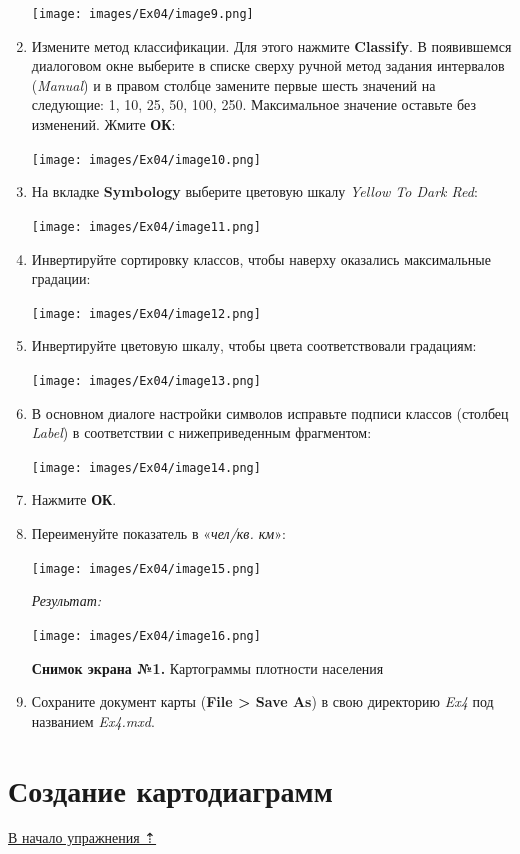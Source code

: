 \documentclass[12pt,]{book}
\begin{document}
\begin{enumerate}
  \texttt{[image: images/Ex04/image9.png]}
\item
  Измените метод классификации. Для этого нажмите \textbf{Classify}. В появившемся диалоговом окне выберите в списке сверху ручной метод задания интервалов (\emph{Manual}) и в правом столбце замените первые шесть значений на следующие: 1, 10, 25, 50, 100, 250. Максимальное значение оставьте без изменений. Жмите \textbf{ОК}:

  \texttt{[image: images/Ex04/image10.png]}
\item
  На вкладке \textbf{Symbology} выберите цветовую шкалу \emph{Yellow To Dark Red}:

  \texttt{[image: images/Ex04/image11.png]}
\item
  Инвертируйте сортировку классов, чтобы наверху оказались максимальные градации:

  \texttt{[image: images/Ex04/image12.png]}
\item
  Инвертируйте цветовую шкалу, чтобы цвета соответствовали градациям:

  \texttt{[image: images/Ex04/image13.png]}
\item
  В основном диалоге настройки символов исправьте подписи классов (столбец \emph{Label}) в соответствии с нижеприведенным фрагментом:

  \texttt{[image: images/Ex04/image14.png]}
\item
  Нажмите \textbf{ОК}.
\item
  Переименуйте показатель в «\emph{чел/кв. км}»:

  \texttt{[image: images/Ex04/image15.png]}

  \emph{Результат:}

  \texttt{[image: images/Ex04/image16.png]}

  \textbf{Снимок экрана №1.} Картограммы плотности населения
\item
  Сохраните документ карты (\textbf{File \textgreater{} Save As}) в свою директорию \emph{Ex4} под названием \emph{Ex4.mxd}.
\end{enumerate}

\hypertarget{map-design-economic-diagrams}{%
\section{Создание картодиаграмм}\label{map-design-economic-diagrams}}

\protect\hyperlink{map-design-economic}{В начало упражнения ⇡}
\end{document}
